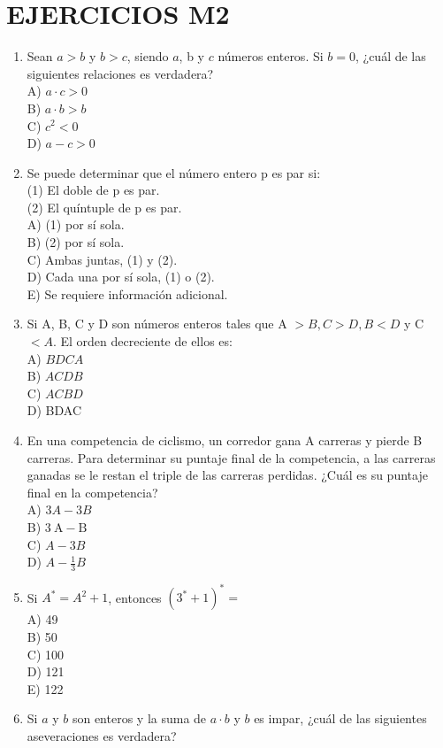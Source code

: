 \documentclass[10pt]{article}
\begin{document}
\section*{EJERCICIOS M2}
\begin{enumerate}
  \item Sean $a>b$ y $b>c$, siendo $a$, b y $c$ números enteros. Si $b=0$, ¿cuál de las siguientes relaciones es verdadera?\\
A) $a \cdot c>0$\\
B) $a \cdot b>b$\\
C) $c^{2}<0$\\
D) $a-c>0$
  \item Se puede determinar que el número entero p es par si:\\
(1) El doble de p es par.\\
(2) El quíntuple de p es par.\\
A) (1) por sí sola.\\
B) (2) por sí sola.\\
C) Ambas juntas, (1) y (2).\\
D) Cada una por sí sola, (1) o (2).\\
E) Se requiere información adicional.
  \item Si A, B, C y D son números enteros tales que A $>B, C>D, B<D$ y C $<A$. El orden decreciente de ellos es:\\
A) $B D C A$\\
B) $A C D B$\\
C) $A C B D$\\
D) BDAC
  \item En una competencia de ciclismo, un corredor gana A carreras y pierde B carreras. Para determinar su puntaje final de la competencia, a las carreras ganadas se le restan el triple de las carreras perdidas. ¿Cuál es su puntaje final en la competencia?\\
A) $3 A-3 B$\\
B) $3 \mathrm{~A}-\mathrm{B}$\\
C) $A-3 B$\\
D) $A-\frac{1}{3} B$
  \item Si $A^{*}=A^{2}+1$, entonces $\left(3^{*}+1\right)^{*}=$\\
A) 49\\
B) 50\\
C) 100\\
D) 121\\
E) 122
  \item Si $a$ y $b$ son enteros y la suma de $a \cdot b$ y $b$ es impar, ¿cuál de las siguientes aseveraciones es verdadera?\\

\end{enumerate}
\end{document}

